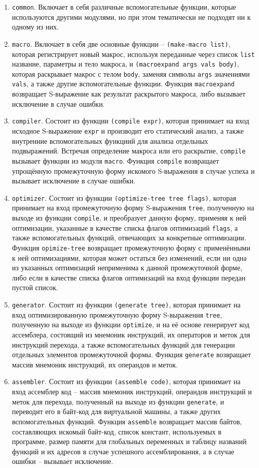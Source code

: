 \begin{enumerate}
\item \texttt{common}. Включает в себя различные вспомогательные функции, которые используются другими модулями, но при этом тематически не подходят ни к одному из них.
\item \texttt{macro}. Включает в себя две основные функции -- \texttt{(make-macro list)}, которая регистрирует новый макрос, используя переданные через список \texttt{list} название, параметры и тело макроса, и \texttt{(macroexpand args vals body)}, которая раскрывает макрос с телом \texttt{body}, заменяя символы \texttt{args} значениями \texttt{vals}, а также другие вспомогательные функции. Функция \texttt{macroexpand} возвращает S-выражение как результат раскрытого макроса, либо вызывает исключение в случае ошибки.
\item \texttt{compiler}. Состоит из функции \texttt{(compile expr)}, которая принимает на вход исходное S-выражение \texttt{expr} и производит его статический анализ, а также внутренние вспомогательных функциий для анализа отдельных подвыражений. Встречая определение макроса или его раскрытие, \texttt{compile} вызывает функции из модуля \texttt{macro}. Функция \texttt{compile} возвращает упрощённую промежуточную форму искомого S-выражения в случае успеха и вызывает исключение в случае ошибки.
\item \texttt{optimizer}. Состоит из функции \texttt{(optimize-tree tree flags)}, которая принимает на вход промежуточную форму S-выражения \texttt{tree}, полученную на выходе из функции \texttt{compile}, и преобразует данную форму, применяя к ней оптимизации, указанные в качестве списка флагов оптимизаций \texttt{flags}, а также вспомогательных функций, отвечающих за конкретные оптимизации. Функция \texttt{opimize-tree} возвращает промежуточную форму с применёнными к ней оптимизациями, которая может остаться без изменений, если ни одна из указанных оптимизаций неприменима к данной промежуточной форме, либо если в качестве списка флагов оптимизаций на вход функции передан пустой список.
\item \texttt{generator}. Состоит из функции \texttt{(generate tree)}, которая принимает на вход оптимизированную промежуточную форму S-выражения \texttt{tree}, полученную на выходе из функции \texttt{optimize}, и на её основе генерирует код ассемблера, состоящий из мнемоник инструкций, их операторов и меток для инструкций перехода, а также вспомогательных функций для генерации отдельных элементов промежуточной формы. Функция \texttt{generate} возвращает массив мнемоник инструкций, их операндов и меток.
\item \texttt{assembler}. Состоит из функции \texttt{(assemble code)}, которая принимает на вход ассемблер код -- массив мнемоник инструкций, операндов инструкций и меток для перехода, полученный на выходе из функции \texttt{generate}, и переводит его в байт-код для виртуальной машины, а также других вспомогательных функций. Функция \texttt{assemble} возвращает массив байтов, составляющих искомый байт-код, список констант, используемых в программе, размер памяти для глобальных переменных и таблицу названий функций и их адресов в случае успешного ассемблирования, а в случае ошибки -- вызывает исключение.
\end{enumerate}
